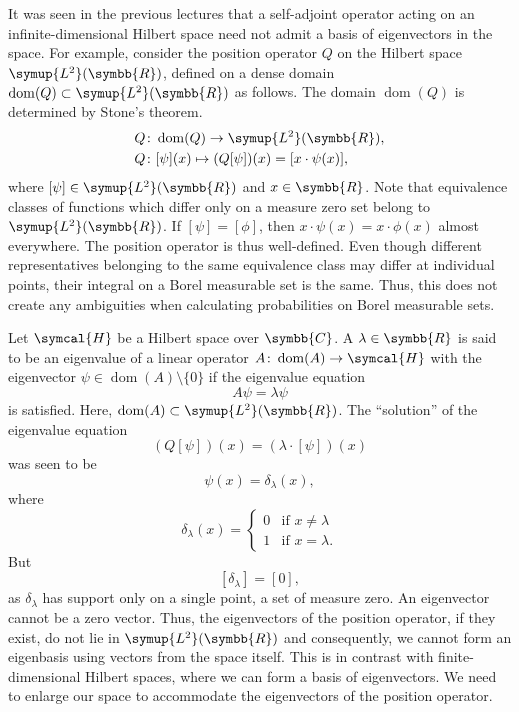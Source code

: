 \documentclass[11pt, a4paper]{article}
\theoremstyle{definition}
\newcommand{\ltwo}{\symup{L^2}}
\newcommand{\position}{Q}
\newcommand{\rr}{\symbb{R}}
\newcommand{\cc}{\symbb{C}}
\newcommand{\dirac}{\delta}
\newcommand{\hilbert}{\symcal{H}}
\newcommand{\ltwor}{\ltwo(\rr)}
\DeclareMathOperator{\domain}{dom}
\begin{document}
    It was seen in the previous lectures that a self-adjoint operator acting on an infinite-dimensional Hilbert space need not admit a basis of eigenvectors in the space. For example, consider the position operator $\position$ on the Hilbert space \(\ltwor\), defined on a dense domain \(\domain(\position) \subset \ltwor\) as follows. The domain $\domain(\position)$ is determined by Stone's  theorem.
    \begin{align*}
        \position &\colon \domain(\position) \rightarrow \ltwor,\\
        \position &\colon [\psi](x) \mapsto (\position[\psi])(x) = [x \cdot \psi(x)],
    \end{align*}
    where \([\psi] \in \ltwor\) and \(x \in \rr\). Note that equivalence classes of functions which differ only on a measure zero set belong to \(\ltwor\). If $[\psi] = [\phi]$, then $x \cdot \psi(x) = x \cdot \phi(x)$ almost everywhere. The position operator is thus well-defined. Even though different representatives belonging to the same equivalence class may differ at individual points, their integral on a Borel measurable set is the same. Thus, this does not create any ambiguities when calculating probabilities on Borel measurable sets.

    Let $\hilbert$ be a Hilbert space over $\cc$. A $\lambda \in \rr$ is said to be an eigenvalue of a linear operator $A \colon \domain(A) \rightarrow \hilbert$ with the eigenvector $\psi \in \domain(A)\setminus\{0\}$ if the eigenvalue equation
    \[A\psi = \lambda \psi\]
    is satisfied. Here, \(\domain(A) \subset \ltwor\).
    The ``solution'' of the eigenvalue equation
    \[(\position[\psi])(x) = (\lambda\cdot[\psi])(x)\]
    was seen to be
    \[\psi(x) = \dirac_\lambda(x),\]
    where
    \[\dirac_\lambda(x) =
    \begin{cases}
        0 & \text{if $x \neq \lambda$}\\
        1 & \text{if $x = \lambda$}.
    \end{cases}
    \]
    But \[[\dirac_\lambda] = [0],\] as $\dirac_\lambda$ has support only on a single point, a set of measure zero. An eigenvector cannot be a zero vector. Thus, the eigenvectors of the position operator, if they exist, do not lie in $\ltwor$ and consequently, we cannot form an eigenbasis using vectors from the space itself. This is in contrast with finite-dimensional Hilbert spaces, where we can form a basis of eigenvectors. We need to enlarge our space to accommodate the eigenvectors of the position operator.
\end{document}

